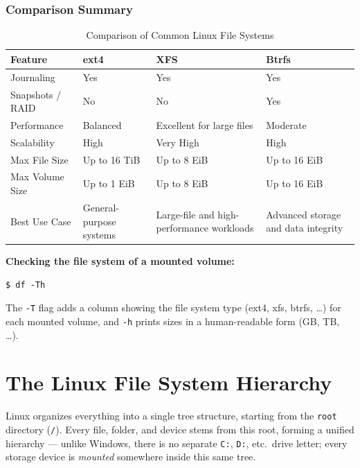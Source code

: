 \subsubsection*{Comparison Summary}
\begin{table}[h!]
\centering
\small
\renewcommand{\arraystretch}{1.3}
\begin{tabular}{|>{\centering\arraybackslash}p{4cm}|>{\centering\arraybackslash}p{3cm}|>{\centering\arraybackslash}p{3cm}|>{\centering\arraybackslash}p{3cm}|}
\hline
\textbf{Feature} & \textbf{ext4} & \textbf{XFS} & \textbf{Btrfs} \\ \hline
Journaling & Yes & Yes & Yes \\ \hline
Snapshots / RAID & No & No & Yes \\ \hline
Performance & Balanced & Excellent for large files & Moderate \\ \hline
Scalability & High & Very High & High \\ \hline
Max File Size & Up to 16 TiB & Up to 8 EiB & Up to 16 EiB \\ \hline
Max Volume Size & Up to 1 EiB & Up to 8 EiB & Up to 16 EiB \\ \hline
Best Use Case & General-purpose systems & Large-file and high-performance workloads & Advanced storage and data integrity \\ \hline
\end{tabular}
\caption{Comparison of Common Linux File Systems}
\label{tab:filesystem-comparison}
\end{table}

\noindent\textbf{Checking the file system of a mounted volume:}
\begin{lstlisting}[language=Terminal]
$ df -Th
\end{lstlisting}
The \texttt{-T} flag adds a column showing the file system type (ext4, xfs, btrfs, \dots) for each mounted volume, and \texttt{-h} prints sizes in a human-readable form (GB, TB, \dots).

\section{The Linux File System Hierarchy}
Linux organizes everything into a single tree structure, starting from the \texttt{root} directory (\texttt{/}). Every file, folder, and device stems from this root, forming a unified hierarchy — unlike Windows, there is no separate \texttt{C:}, \texttt{D:}, etc.\ drive letter; every storage device is \emph{mounted} somewhere inside this same tree.

